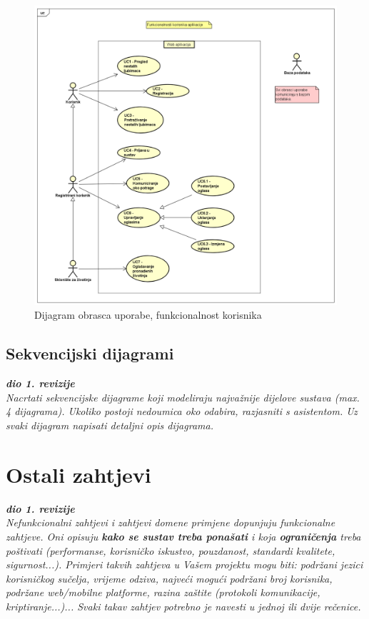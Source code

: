 					\begin{figure}[htb]
						\centering
						\includegraphics[width=\textwidth]{slike/funkcionalnosti_korisnika.png}
						\caption{Dijagram obrasca uporabe, funkcionalnost korisnika}
					\end{figure}		
			
			\pagebreak	
			\subsection{Sekvencijski dijagrami}
				
				\textbf{\textit{dio 1. revizije}}\\
				
				\textit{Nacrtati sekvencijske dijagrame koji modeliraju najvažnije dijelove sustava (max. 4 dijagrama). Ukoliko postoji nedoumica oko odabira, razjasniti s asistentom. Uz svaki dijagram napisati detaljni opis dijagrama.}
				\eject
	
		\section{Ostali zahtjevi}
		
			\textbf{\textit{dio 1. revizije}}\\
		 
			 \textit{Nefunkcionalni zahtjevi i zahtjevi domene primjene dopunjuju funkcionalne zahtjeve. Oni opisuju \textbf{kako se sustav treba ponašati} i koja \textbf{ograničenja} treba poštivati (performanse, korisničko iskustvo, pouzdanost, standardi kvalitete, sigurnost...). Primjeri takvih zahtjeva u Vašem projektu mogu biti: podržani jezici korisničkog sučelja, vrijeme odziva, najveći mogući podržani broj korisnika, podržane web/mobilne platforme, razina zaštite (protokoli komunikacije, kriptiranje...)... Svaki takav zahtjev potrebno je navesti u jednoj ili dvije rečenice.}
			 
			 
			 
	